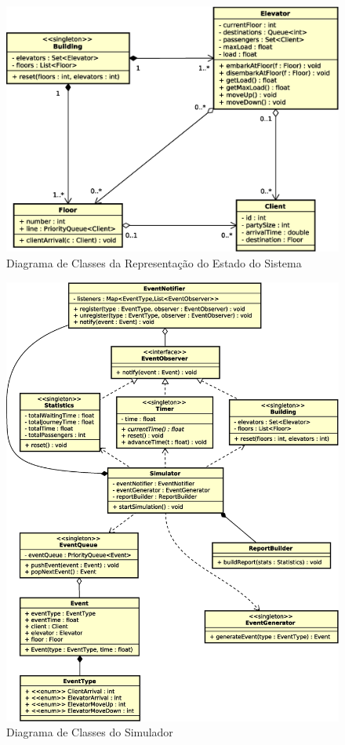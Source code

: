 \begin{figure}[htb!]
  \centering
  \includegraphics[scale=0.6]{img/state.eps}
  \caption{Diagrama de Classes da Representação do Estado do Sistema}
\label{fig:diagram:system}
\end{figure}

\begin{figure}[htb!]
  \centering
  \includegraphics[scale=0.6]{img/simulator.eps}
  \caption{Diagrama de Classes do Simulador}
\label{fig:diagram:simulator}
\end{figure}


